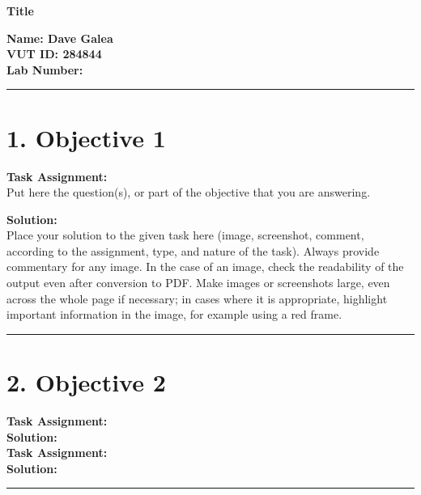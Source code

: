 \documentclass[a4paper,12pt]{article}
\begin{document}
\begin{center}
    {\Large \textbf{Title}}\\[1em]
\end{center}

\vspace{1cm}

\textbf{Name: Dave Galea}\\[0.5em]
\textbf{VUT ID: 284844} \\[0.5em]
\textbf{Lab Number:} \\[0.5em]

\vspace{0.5cm}
\hrule
\vspace{0.5cm}

\section*{1. Objective 1}

\textbf{Task Assignment:} \\
Put here the question(s), or part of the objective that you are answering. 

\vspace{0.5em}
\textbf{Solution:} \\
Place your solution to the given task here (image, screenshot, comment, according to the assignment, type, and nature of the task). Always provide commentary for any image. In the case of an image, check the readability of the output even after conversion to PDF. Make images or screenshots large, even across the whole page if necessary; in cases where it is appropriate, highlight important information in the image, for example using a red frame.

\vspace{1em}
\hrule
\vspace{0.5em}

\section*{2. Objective 2}

\textbf{Task Assignment:} \\

\textbf{Solution:} \\[1em]

\textbf{Task Assignment:} \\

\textbf{Solution:} \\

\vspace{1em}
\hrule
\vspace{0.5em}
\end{document}
